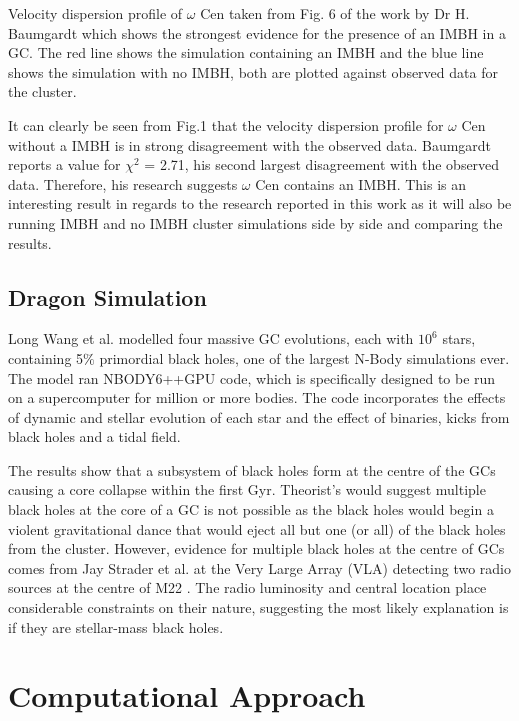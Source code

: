 \documentclass{article}
\begin{document}
\begin{multicols}{2}
    
     {\small Velocity dispersion profile of $\omega$ Cen taken from Fig. 6 of the work by Dr H. Baumgardt \cite{HB} which shows the strongest evidence for the presence of an IMBH in a GC. The red line shows the simulation containing an IMBH and the blue line shows the simulation with no IMBH, both are plotted against observed data for the cluster.}
\vspace{2mm}

It can clearly be seen from Fig.1 that the velocity dispersion profile for $\omega$ Cen without a IMBH is in strong disagreement with the observed data. Baumgardt reports a value for $\chi^2$ = 2.71, his second largest disagreement with the observed data. Therefore, his research suggests $\omega$ Cen contains an IMBH. This is an interesting result in regards to the research reported in this work as it will also be running IMBH and no IMBH cluster simulations side by side and comparing the results. 

\subsection{Dragon Simulation}

Long Wang et al. modelled four massive GC evolutions, each with $10^6$ stars, containing 5$\%$ primordial black holes, one of the largest N-Body simulations ever. The model ran NBODY6++GPU code, which is specifically designed to be run on a supercomputer for million or more bodies. The code incorporates the effects of dynamic and stellar evolution of each star and the effect of binaries, kicks from black holes and a tidal field.

The results show that a subsystem of black holes form at the centre of the GCs causing a core collapse within the first Gyr. Theorist's would suggest multiple black holes at the core of a GC is not possible as the black holes would begin a violent gravitational dance that would eject all but one (or all) of the black holes from the cluster. However, evidence for multiple black holes at the centre of GCs comes from Jay Strader et al. at the Very Large Array (VLA) detecting two radio sources at the centre of M22 \cite{M22}. The radio luminosity and central location place considerable constraints on their nature, suggesting the most likely explanation is if they are stellar-mass black holes.


\section{Computational Approach}


\end{multicols}
\end{document}
